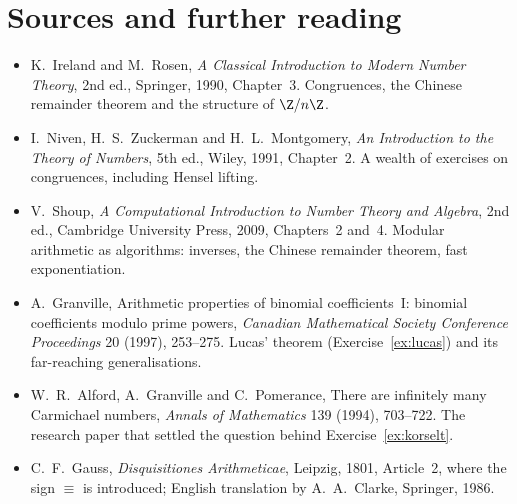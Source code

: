\section*{Sources and further reading}

\begin{itemize}
\item K.~Ireland and M.~Rosen, \emph{A Classical Introduction to Modern Number Theory}, 2nd ed., Springer, 1990, Chapter~3. Congruences, the Chinese remainder theorem and the structure of $\Z/n\Z$.
\item I.~Niven, H.~S.~Zuckerman and H.~L.~Montgomery, \emph{An Introduction to the Theory of Numbers}, 5th ed., Wiley, 1991, Chapter~2. A wealth of exercises on congruences, including Hensel lifting.
\item V.~Shoup, \emph{A Computational Introduction to Number Theory and Algebra}, 2nd ed., Cambridge University Press, 2009, Chapters~2 and~4. Modular arithmetic as algorithms: inverses, the Chinese remainder theorem, fast exponentiation.
\item A.~Granville, Arithmetic properties of binomial coefficients~I: binomial coefficients modulo prime powers, \emph{Canadian Mathematical Society Conference Proceedings} 20 (1997), 253--275. Lucas' theorem (Exercise~\ref{ex:lucas}) and its far-reaching generalisations.
\item W.~R.~Alford, A.~Granville and C.~Pomerance, There are infinitely many Carmichael numbers, \emph{Annals of Mathematics} 139 (1994), 703--722. The research paper that settled the question behind Exercise~\ref{ex:korselt}.
\item C.~F.~Gauss, \emph{Disquisitiones Arithmeticae}, Leipzig, 1801, Article~2, where the sign $\equiv$ is introduced; English translation by A.~A.~Clarke, Springer, 1986.
\end{itemize}

